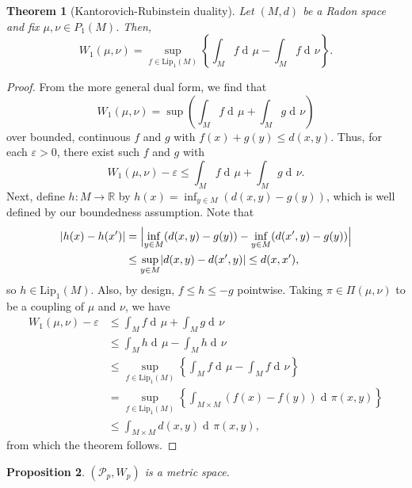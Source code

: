 \documentclass{article}
\newtheorem{theorem}{Theorem}
\newtheorem{proposition}[theorem]{Proposition}
\newcommand{\dd}{\mathop{\mathrm{d}\!}}
\newcommand{\R}{\mathbb{R}}
\newcommand{\Lip}{\mathrm{Lip}}
\renewcommand{\P}{\mathcal{P}}
\DeclarePairedDelimiter{\abs}{\lvert}{\rvert}
\begin{document}
\begin{theorem}[Kantorovich-Rubinstein duality]
    Let $(M,d)$ be a Radon space and fix $\mu,\nu \in P_1(M)$. Then,
    \begin{equation*}
        W_1(\mu,\nu) = \sup_{f \in \Lip_1(M)}\left\{\int_M f \dd\mu - \int_M f \dd\nu \right\}.
    \end{equation*}
\end{theorem}
\begin{proof}
    From the more general dual form, we find that
    \begin{equation*}
        W_1(\mu,\nu) = \sup\left(\int_M f \dd \mu + \int_M g \dd \nu\right)
    \end{equation*}
    over bounded, continuous $f$ and $g$ with $f(x) + g(y) \leq d(x,y)$. Thus, for each $\varepsilon > 0$, there exist such $f$ and $g$ with
    \begin{equation*}
        W_1(\mu,\nu) - \varepsilon \leq \int_M f \dd\mu + \int_M g \dd\nu.
    \end{equation*}
    Next, define $h:M \to \R$ by $h(x) = \inf_{y \in M}(d(x,y) - g(y))$, which is well defined by our boundedness assumption. Note that
    \begin{align*}
        \abs{h(x) - h(x')} &= \abs[\Big]{\inf_{y \in M}(d(x,y) - g(y)) - \inf_{y \in M}(d(x',y) - g(y))}\\
        &\leq \sup_{y \in M} \abs{d(x,y) - d(x',y)} \leq d(x,x'),
    \end{align*}
    so $h \in \Lip_1(M)$. Also, by design, $f \leq h \leq -g$ pointwise. Taking $\pi \in \Pi(\mu,\nu)$ to be a coupling of $\mu$ and $\nu$, we have
    \begin{align*}
        W_1(\mu,\nu) - \varepsilon &\leq \int_M f \dd\mu + \int_M g \dd\nu\\
        &\leq \int_M h \dd\mu - \int_M h \dd\nu\\
        &\leq \sup_{f \in \Lip_1(M)} \left\{\int_M f \dd\mu - \int_M f \dd\nu\right\}\\
        &=  \sup_{f \in \Lip_1(M)} \left\{\int_{M \times M} (f(x) - f(y)) \dd\pi(x,y)\right\}\\
        &\leq \int_{M \times M} d(x,y) \dd\pi(x,y),
    \end{align*}
    from which the theorem follows.
\end{proof}

\begin{proposition}
$(\P_p, W_p)$ is a metric space.
\end{proposition}
\end{document}
